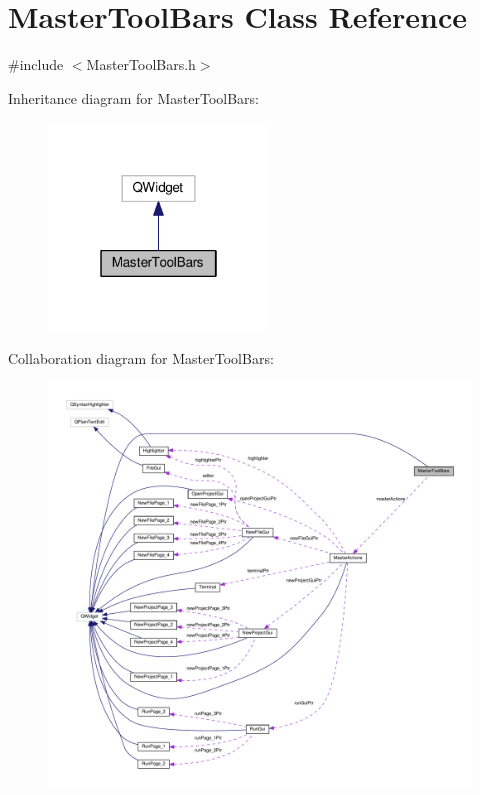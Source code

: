 \hypertarget{class_master_tool_bars}{\section{Master\-Tool\-Bars Class Reference}
\label{class_master_tool_bars}
}


{\ttfamily \#include $<$Master\-Tool\-Bars.\-h$>$}



Inheritance diagram for Master\-Tool\-Bars\-:\nopagebreak
\begin{figure}[H]
\begin{center}
\leavevmode
\includegraphics[width=166pt]{class_master_tool_bars__inherit__graph}
\end{center}
\end{figure}


Collaboration diagram for Master\-Tool\-Bars\-:\nopagebreak
\begin{figure}[H]
\begin{center}
\leavevmode
\includegraphics[width=350pt]{class_master_tool_bars__coll__graph}
\end{center}
\end{figure}
